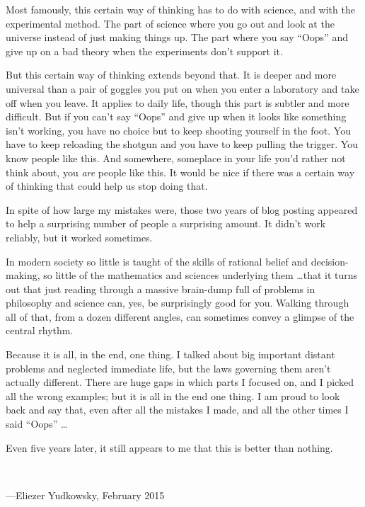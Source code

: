 \documentclass[letterpaper]{book}
\begin{document}
{
 Most famously, this certain way of thinking has to do with
science, and with the experimental method. The part of science where
you go out and look at the universe instead of just making things up.
The part where you say ``Oops'' and
give up on a bad theory when the experiments don't
support it.}

{
 But this certain way of thinking extends beyond that. It is deeper
and more universal than a pair of goggles you put on when you enter a
laboratory and take off when you leave. It applies to daily life,
though this part is subtler and more difficult. But if you
can't say ``Oops''
and give up when it looks like something isn't working,
you have no choice but to keep shooting yourself in the foot. You have
to keep reloading the shotgun and you have to keep pulling the trigger.
You know people like this. And somewhere, someplace in your life
you'd rather not think about, you \textit{are} people
like this. It would be nice if there was a certain way of thinking that
could help us stop doing that.}

{
 In spite of how large my mistakes were, those two years of blog
posting appeared to help a surprising number of people a surprising
amount. It didn't work reliably, but it worked
sometimes.}

{
 In modern society so little is taught of the skills of rational
belief and decision-making, so little of the mathematics and sciences
underlying them \ldots that it turns out that just reading through a
massive brain-dump full of problems in philosophy and science can, yes,
be surprisingly good for you. Walking through all of that, from a dozen
different angles, can sometimes convey a glimpse of the central
rhythm.}

{
 Because it is all, in the end, one thing. I talked about big
important distant problems and neglected immediate life, but the laws
governing them aren't actually different. There are
huge gaps in which parts I focused on, and I picked all the wrong
examples; but it is all in the end one thing. I am proud to look back
and say that, even after all the mistakes I made, and all the other
times I said ``Oops'' \ldots}

{
 Even five years later, it still appears to me that this is better
than nothing.}

{
 ~}

{\raggedleft
 {}---Eliezer Yudkowsky,\newline
 February 2015
\par}
\end{document}
